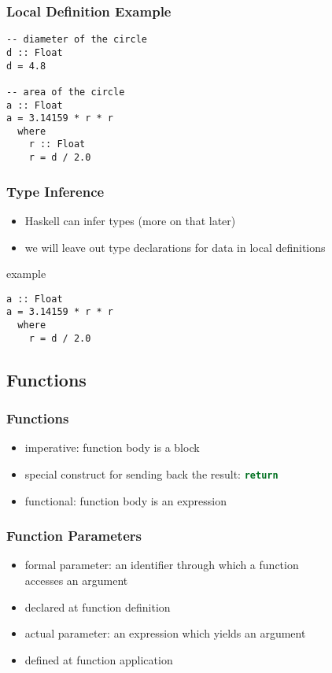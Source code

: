 \documentclass[dvipsnames]{beamer}
\theoremstyle{plain}
\begin{document}
\begin{frame}[fragile]
  \frametitle{Local Definition Example}

  \begin{lstlisting}
-- diameter of the circle
d :: Float
d = 4.8

-- area of the circle
a :: Float
a = 3.14159 * r * r
  where
    r :: Float
    r = d / 2.0
  \end{lstlisting}
\end{frame}

\begin{frame}[fragile]
  \frametitle{Type Inference}

  \begin{itemize}
    \item Haskell can infer types (more on that later)
    \item we will leave out type declarations for data in local definitions
  \end{itemize}

  \begin{exampleblock}{example}
    \begin{lstlisting}
a :: Float
a = 3.14159 * r * r
  where
    r = d / 2.0
    \end{lstlisting}
  \end{exampleblock}
\end{frame}

\subsection{Functions}

\begin{frame}
  \frametitle{Functions}

  \begin{itemize}
    \item imperative: function body is a block
    \item special construct for sending back the result:
      \lstinline[language=Python]{return}

    \bigskip
    \item functional: function body is an expression
  \end{itemize}
\end{frame}

\begin{frame}
  \frametitle{Function Parameters}

  \begin{itemize}
    \item \alert{formal parameter}: an identifier through which a function\\
      accesses an argument
    \item declared at function definition

    \pause
    \medskip
    \item \alert{actual parameter}: an expression which yields an argument
    \item defined at function application
  \end{itemize}
\end{frame}
\end{document}
